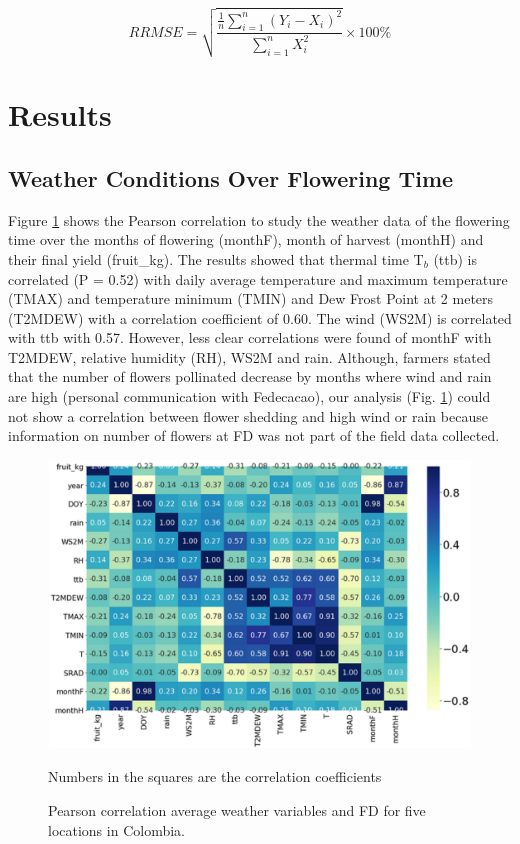 \documentclass[gene,journal,article,submit,moreauthors,pdftex]{Definitions/mdpi}
\begin{document}
\begin{equation}
RRMSE= \sqrt{\frac{\frac{1}{n}  \sum_{i=1}^{n} (Y_{i}-X_{i})^{2}}{\sum_{i=1}^{n} X_{i}^{2} } } \times 100\% 
\label{equ:RRMSE}
\end{equation}



\section{Results}

\subsection{Weather Conditions Over Flowering Time }
Figure \ref{fig:heat} shows the Pearson correlation to study the weather data of the flowering time over the months of flowering  (monthF), month of harvest (monthH) and their final yield (fruit\_kg). The results showed that thermal time T$_{b}$ (ttb) is correlated (P = 0.52) with daily average temperature and maximum temperature (TMAX) and  temperature minimum (TMIN) and Dew Frost Point at 2 meters (T2MDEW) with  a correlation coefficient of 0.60. The wind (WS2M) is correlated with ttb with 0.57. However, less clear correlations were found of monthF  with T2MDEW, relative humidity (RH), WS2M and rain. Although, farmers stated that the number of flowers pollinated decrease by months where wind and rain are high (personal communication with Fedecacao), our analysis  (Fig. \ref{fig:heat}) could not show a correlation between flower shedding and high wind or rain because information on number of  flowers at FD was not part of the field data collected. 


\begin{figure}[h!]
	\centering
	\includegraphics[scale=0.2]{images/heatm.png}\\
	\caption{\footnotesize {Pearson correlation average weather variables and FD for five locations in Colombia. \\}}
	\label{fig:heat} 
	{\footnotesize Numbers in the squares are the correlation coefficients }
\end{figure}
\newpage
\end{document}
